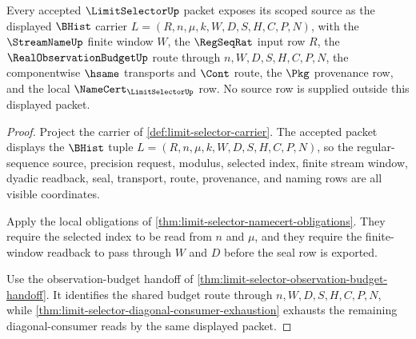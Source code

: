 \begin{theorem}
\label{thm:limit-selector-scoped-source-rows}
Every accepted $\LimitSelectorUp$ packet exposes its scoped source as the displayed $\BHist$ carrier $L=(R,n,\mu,k,W,D,S,H,C,P,N)$, with the $\StreamNameUp$ finite window $W$, the $\RegSeqRat$ input row $R$, the $\RealObservationBudgetUp$ route through $n,W,D,S,H,C,P,N$, the componentwise $\hsame$ transports and $\Cont$ route, the $\Pkg$ provenance row, and the local $\NameCert_{\LimitSelectorUp}$ row. No source row is supplied outside this displayed packet.
\end{theorem}
\begin{proof}
Project the carrier of \autoref{def:limit-selector-carrier}. The accepted packet displays the $\BHist$ tuple $L=(R,n,\mu,k,W,D,S,H,C,P,N)$, so the regular-sequence source, precision request, modulus, selected index, finite stream window, dyadic readback, seal, transport, route, provenance, and naming rows are all visible coordinates.

Apply the local obligations of \autoref{thm:limit-selector-namecert-obligations}. They require the selected index to be read from $n$ and $\mu$, and they require the finite-window readback to pass through $W$ and $D$ before the seal row is exported.

Use the observation-budget handoff of \autoref{thm:limit-selector-observation-budget-handoff}. It identifies the shared budget route through $n,W,D,S,H,C,P,N$, while \autoref{thm:limit-selector-diagonal-consumer-exhaustion} exhausts the remaining diagonal-consumer reads by the same displayed packet.
\end{proof}

